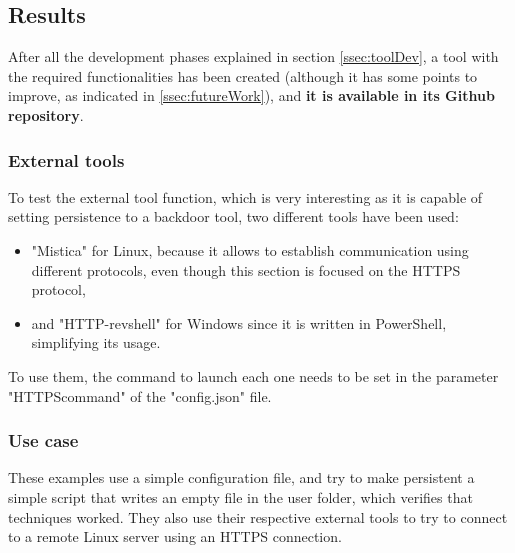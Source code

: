 \pagebreak
\subsection{Results}
\label{ssec:results}
After all the development phases explained in section \ref{ssec:toolDev}, a tool with the required functionalities has been created (although it has some points to improve, as indicated in \ref{ssec:futureWork}), and \textbf{it is available in its Github repository\cite{ThisProjectGit}}.


\subsubsection{External tools}

To test the external tool function, which is very interesting as it is capable of setting persistence to a backdoor tool, two different tools have been used:
\begin{itemize}
\item "Mistica"\cite{Mistica} for Linux, because it allows to establish communication using different protocols, even though this section is focused on the HTTPS protocol,
\item and "HTTP-revshell"\cite{HTTPRevshell} for Windows since it is written in PowerShell, simplifying its usage.
\end{itemize} 

To use them, the command to launch each one needs to be set in the parameter "HTTPScommand" of the "config.json" file.

\subsubsection{Use case}
These examples use a simple configuration file, and try to make persistent a simple script that writes an empty file in the user folder, which verifies that techniques worked. They also use their respective external tools to try to connect to a remote Linux server using an HTTPS connection.


